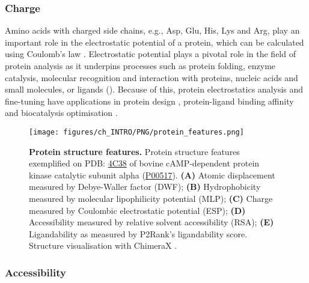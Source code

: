 \subsubsection{Charge}

Amino acids with charged side chains, e.g., Asp, Glu, His, Lys and Arg, play an important role in the electrostatic potential of a protein, which can be calculated using Coulomb's law \cite{COULOMB_1785_LAW}. Electrostatic potential plays a pivotal role in the field of protein analysis as it underpins processes such as protein folding, enzyme catalysis, molecular recognition and interaction with proteins, nucleic acids and small molecules, or ligands \cite{ZHOU_2018_ESP} (). Because of this, protein electrostatics analysis and fine-tuning have applications in protein design \cite{GORHAM_2011_ESP}, protein-ligand binding affinity \cite{KUKIC_2010_ELECTROSTATICS} and biocatalysis optimisation \cite{VASCON_2020_ESP}.

\begin{figure}[htb!]
    \centering
    \texttt{[image: figures/ch\_INTRO/PNG/protein\_features.png]}
    \caption[Protein structure features]{\textbf{Protein structure features.} Protein structure features exemplified on PDB: \href{https://www.ebi.ac.uk/pdbe/entry/pdb/4c38}{4C38} \cite{COUTY_2013_ONCO} of bovine cAMP-dependent protein kinase catalytic subunit alpha (\href{https://www.uniprot.org/uniprotkb/P00517/entry}{P00517}). \textbf{(A)} Atomic displacement measured by Debye-Waller factor (DWF); \textbf{(B)} Hydrophobicity measured by molecular lipophilicity potential (MLP); \textbf{(C)} Charge measured by Coulombic electrostatic potential (ESP); \textbf{(D)} Accessibility measured by relative solvent accessibility (RSA); \textbf{(E)} Ligandability as measured by P2Rank's ligandability score. Structure visualisation with ChimeraX \cite{PETTERSEN_2021_CHIMERAX}.}
    \label{fig:protein_features}
\end{figure}

\subsubsection{Accessibility}

